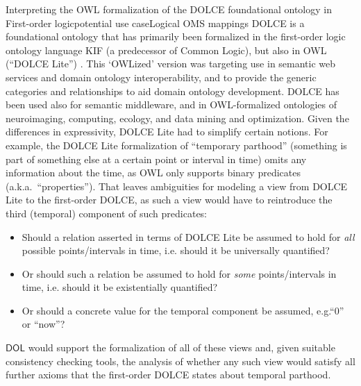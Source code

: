 \documentclass[10pt,fleqn,final]{scrreprt}
\makeatletter
\newcommand*{\eg}{e.g.\@\xspace}
\newcommand*{\ie}{i.e.\@\xspace}
\newcommand*{\DOL}{\ensuremath{\mathsf{DOL}}\xspace}
\makeatother
\begin{document}
\begin{usecase}{Interpreting the OWL formalization of the DOLCE foundational ontology in First-order logic}{potential use case}{Logical OMS mappings}
  DOLCE is a foundational ontology that has primarily been formalized in the first-order logic ontology language KIF (a predecessor of Common Logic), but also in OWL (``DOLCE Lite'') \cite{dolce}. This ‘OWLized’ version was targeting use in semantic web services and domain ontology interoperability, and to provide the generic categories and relationships to aid domain ontology development. DOLCE has been used also for semantic middleware, and in OWL-formalized ontologies of neuroimaging, computing, ecology, and data mining and optimization.
  Given the differences in expressivity, DOLCE Lite had to simplify certain notions.  For example, the DOLCE Lite formalization of ``temporary parthood'' (something is part of something else at a certain point or interval in time) omits any information about the time, as OWL only supports binary predicates (a.k.a.\ ``properties'').  That leaves ambiguities for modeling a view from DOLCE Lite to the first-order DOLCE, as such a view would have to reintroduce the third (temporal) component of such predicates:
  \begin{itemize}
  \item Should a relation asserted in terms of DOLCE Lite be assumed to hold for \emph{all} possible points/intervals in time, \ie should it be universally quantified?
  \item Or should such a relation be assumed to hold for \emph{some} points/intervals in time, \ie should it be existentially quantified?
  \item Or should a concrete value for the temporal component be assumed, \eg ``0'' or ``now''?
  \end{itemize}
  
  \DOL would support the formalization of  all of these views and, given suitable consistency checking tools, the analysis of  whether any such view would satisfy all further axioms that the first-order DOLCE states about temporal parthood.
\end{usecase}
\end{document}
